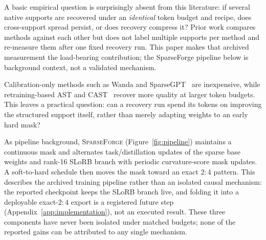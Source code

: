\documentclass{article}
\newcommand{\method}{\textsc{SparseForge}}
\begin{document}
A basic empirical question is surprisingly absent from this literature: if several native supports are recovered under an \emph{identical} token budget and recipe, does cross-support spread persist, or does recovery compress it? Prior work compares methods against each other but does not label multiple supports per method and re-measure them after one fixed recovery run. This paper makes that archived measurement the load-bearing contribution; the SparseForge pipeline below is background context, not a validated mechanism.

Calibration-only methods such as Wanda and SparseGPT~\citep{sun2023wanda,frantar2023sparsegpt} are inexpensive, while retraining-based AST and CAST~\citep{huang2025ast,huang2025cast} recover more quality at larger token budgets. This leaves a practical question: can a recovery run spend its tokens on improving the structured support itself, rather than merely adapting weights to an early hard mask?

As pipeline background, \method{} (Figure~\ref{fig:pipeline}) maintains a continuous mask and alternates task/distillation updates of the sparse base weights and rank-16 SLoRB branch with periodic curvature-score mask updates. A soft-to-hard schedule then moves the mask toward an exact $2{:}4$ pattern. This describes the archived training pipeline rather than an isolated causal mechanism: the reported checkpoint keeps the SLoRB branch live, and folding it into a deployable exact-$2{:}4$ export is a registered future step (Appendix~\ref{app:implementation}), not an executed result. These three components have never been isolated under matched budgets; none of the reported gains can be attributed to any single mechanism.
\end{document}
